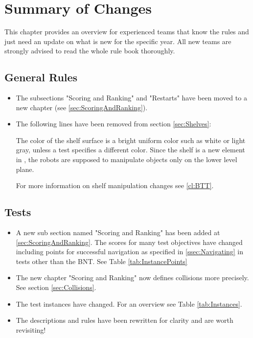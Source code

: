
\chapter{Summary of Changes}


This chapter provides an overview for experienced teams that know the rules and just need an update on what is new for the specific year. All new teams are strongly advised to read the whole rule book thoroughly.

\section{General Rules}
\begin{itemize}
  \item The subsections "Scoring and Ranking" and "Restarts" have been moved to a new chapter (see \ref{sec:ScoringAndRanking}).
  \item The following lines have been removed from section \ref{sec:Shelves}:\par
  The color of the shelf surface is a bright uniform color such as white or light gray, unless a test specifies a different color.
Since the shelf is a new element in \RCAW, the robots are supposed to manipulate objects only on the lower level plane.\par
For more information on shelf manipulation changes see \ref{cl:BTT}.
\end{itemize}

\section{Tests}
\begin{itemize}
  \item A new sub section named "Scoring and Ranking" has been added at \ref{sec:ScoringAndRanking}. The scores for many test objectives have changed including points for successful navigation as specified in \ref{ssec:Navigating} in tests other than the BNT. See Table \ref{tab:InstancePoints}
  \item The new chapter "Scoring and Ranking" now defines collisions more precisely. See section \ref{sec:Collisions}.
  \item The test instances have changed. For an overview see Table \ref{tab:Instances}.
  \item The descriptions and rules have been rewritten for clarity and are worth revisiting!
\end{itemize}

